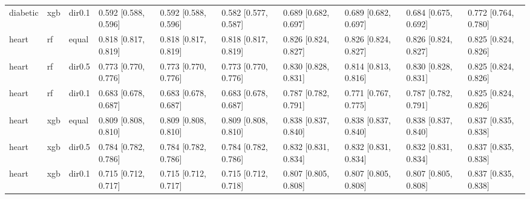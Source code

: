 \begin{tabular}{llllllllll}
diabetic & xgb & dir0.1 & 0.592 [0.588, 0.596] & 0.592 [0.588, 0.596] & 0.582 [0.577, 0.587] & 0.689 [0.682, 0.697] & 0.689 [0.682, 0.697] & 0.684 [0.675, 0.692] & 0.772 [0.764, 0.780] \\
\addlinespace
heart & rf & equal & 0.818 [0.817, 0.819] & 0.818 [0.817, 0.819] & 0.818 [0.817, 0.819] & 0.826 [0.824, 0.827] & 0.826 [0.824, 0.827] & 0.826 [0.824, 0.827] & 0.825 [0.824, 0.826] \\
heart & rf & dir0.5 & 0.773 [0.770, 0.776] & 0.773 [0.770, 0.776] & 0.773 [0.770, 0.776] & 0.830 [0.828, 0.831] & 0.814 [0.813, 0.816] & 0.830 [0.828, 0.831] & 0.825 [0.824, 0.826] \\
heart & rf & dir0.1 & 0.683 [0.678, 0.687] & 0.683 [0.678, 0.687] & 0.683 [0.678, 0.687] & 0.787 [0.782, 0.791] & 0.771 [0.767, 0.775] & 0.787 [0.782, 0.791] & 0.825 [0.824, 0.826] \\
heart & xgb & equal & 0.809 [0.808, 0.810] & 0.809 [0.808, 0.810] & 0.809 [0.808, 0.810] & 0.838 [0.837, 0.840] & 0.838 [0.837, 0.840] & 0.838 [0.837, 0.840] & 0.837 [0.835, 0.838] \\
heart & xgb & dir0.5 & 0.784 [0.782, 0.786] & 0.784 [0.782, 0.786] & 0.784 [0.782, 0.786] & 0.832 [0.831, 0.834] & 0.832 [0.831, 0.834] & 0.832 [0.831, 0.834] & 0.837 [0.835, 0.838] \\
heart & xgb & dir0.1 & 0.715 [0.712, 0.717] & 0.715 [0.712, 0.717] & 0.715 [0.712, 0.718] & 0.807 [0.805, 0.808] & 0.807 [0.805, 0.808] & 0.807 [0.805, 0.808] & 0.837 [0.835, 0.838] \\
\bottomrule
\end{tabular}
